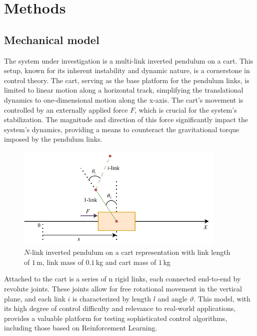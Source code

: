 \section{Methods}

\subsection{Mechanical model}

The system under investigation is a multi-link inverted pendulum on a cart. This setup, known for its inherent instability and dynamic nature, is a cornerstone in control theory. The cart, serving as the base platform for the pendulum links, is limited to linear motion along a horizontal track, simplifying the translational dynamics to one-dimensional motion along the x-axis. The cart's movement is controlled by an externally applied force $F$, which is crucial for the system's stabilization. The magnitude and direction of this force significantly impact the system's dynamics, providing a means to counteract the gravitational torque imposed by the pendulum links. 

\begin{figure}[h]
\centering
\includegraphics[width=10cm]{Figures/PendulumFinal_.pdf}
\caption{$N$-link inverted pendulum on a cart representation with link length of $1\,$m, link mass of $0.1\,$kg and cart mass of $1\,$kg~\cite{manzl2023relrl}}
\label{fig: n-pendulum on a cart}
\end{figure}

Attached to the cart is a series of n rigid links, each connected end-to-end by revolute joints. These joints allow for free rotational movement in the vertical plane, and each link 
$i$ is characterized by length $l$ and angle $\vartheta$.
This model, with its high degree of control difficulty and relevance to real-world applications, provides a valuable platform for testing sophisticated control algorithms, including those based on Reinforcement Learning.


